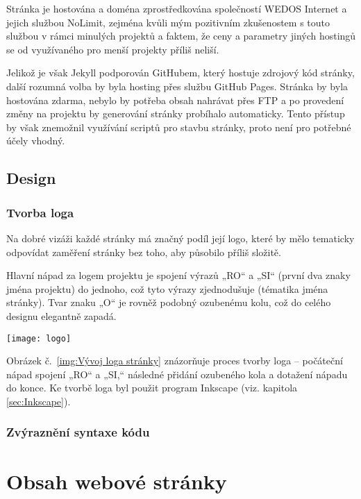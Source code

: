 \documentclass[a4paper, 12pt]{article}
\begin{document}
  Stránka je hostována a doména zprostředkována společností WEDOS Internet a jejich službou NoLimit, zejména kvůli mým pozitivním zkušenostem s touto službou v rámci minulých projektů a faktem, že ceny a parametry jiných hostingů se od využívaného pro menší projekty příliš neliší.

  Jelikož je však Jekyll podporován GitHubem, který hostuje zdrojový kód stránky, další rozumná volba by byla hosting přes službu GitHub Pages\cite{github-pages}. Stránka by byla hostována zdarma, nebylo by potřeba obsah nahrávat přes FTP a po provedení změny na projektu by generování stránky probíhalo automaticky. Tento přístup by však znemožnil využívání scriptů pro stavbu stránky, proto není pro potřebné účely vhodný.


  \subsection{Design}

  \subsubsection{Tvorba loga}
  Na dobré vizáži každé stránky má značný podíl její logo, které by mělo tematicky odpovídat zaměření stránky bez toho, aby působilo příliš složitě.

  Hlavní nápad za logem projektu je spojení výrazů „RO“ a „SI“ (první dva znaky jména projektu) do jednoho, což tyto výrazy zjednodušuje (tématika jména stránky). Tvar znaku „O“ je rovněž podobný ozubenému kolu, což do celého designu elegantně zapadá.

  \begin{center}
    \texttt{[image: logo]}
    \label{img:Vývoj loga stránky}

  \end{center}

  Obrázek č.~\ref{img:Vývoj loga stránky} znázorňuje proces tvorby loga -- počáteční nápad spojení „RO“ a „SI,“ následné přidání ozubeného kola a dotažení nápadu do konce. Ke tvorbě loga byl použit program Inkscape (viz. kapitola \ref{sec:Inkscape}).


  \subsubsection{Zvýraznění syntaxe kódu}

  \section{Obsah webové stránky}
\end{document}
